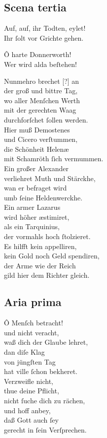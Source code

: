 \documentclass{ees}
\newenvironment{lyrics}[1]{%
  \subsection{#1}\nopagebreak%
  \begin{lyricslist}%
  \let\voice\item%
}{%
  \end{lyricslist}%
}
\begin{document}
\begin{lyrics}{Scena tertia}
  \voice[St: Michael]
  Auf, auf, ihr Todten, eylet!\\
  Ihr ſolt vor Grichte gehen.

  \voice[Chorus]
  Ô harte Donnerworth!\\
  Wer wird alda beſtehen!

  \voice[St: Michael]
  Nunmehro brechet [?] an\\
  der groß und bittre Tag,\\
  wo aller Menſchen Werth\\
  mit der gerechten Waag\\
  durchforſchet ſollen werden.\\
  Hier muß Demostenes\\
  und Cicero verſtummen,\\
  die Schönheit Helenæ\\
  mit Schamröth ſich vermummen.\\
  Ein großer Alexander\\
  verliehret Muth und Stärckhe,\\
  wan er befraget wird\\
  umb ſeine Heldenwerckhe.\\
  Ein armer Lazarus\\
  wird höher æstimiret,\\
  als ein Tarquinius,\\
  der vormahls hoch ſtolzieret.\\
  Es hilfft kein appelliren,\\
  kein Gold noch Geld spendiren,\\
  der Arme wie der Reich\\
  gild hier dem Richter gleich.
\end{lyrics}
\clearpage
\begin{lyrics}{Aria prima}
  \voice[St: Michael]
  Ô Menſch betracht!\\
  und nicht veracht,\\
  waß dich der Glaube lehret,\\
  dan diſe Klag\\
  von jüngſten Tag\\
  hat ville ſchon bekheret.\\[1ex]
  Verzweifle nicht,\\
  thue deine Pflicht,\\
  nicht ſuche dich zu rächen,\\
  und hoff anbey,\\
  daß Gott auch ſey\\
  gerecht in ſein Verſprechen.
\end{lyrics}
\end{document}
